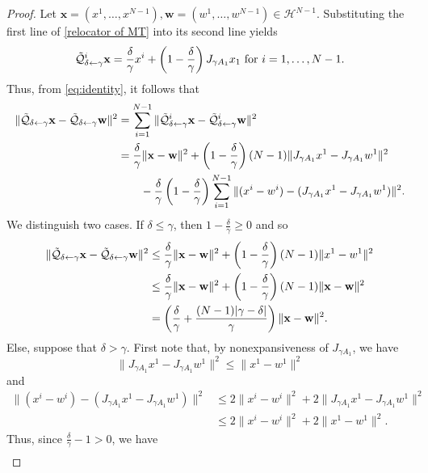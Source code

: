 \documentclass[a4paper,12pt]{article}
\begin{document}
\begin{proof}
    Let $\mathbf{x}=(x^1,\dots,x^{N-1}), \mathbf{w}=(w^1,\dots,w^{N-1}) \in \mathcal{H}^{N-1}$. Substituting the first line of \eqref{relocator of MT} into its second line yields 
\begin{equation*}\mathcal{\Tilde{Q}}^i_{\delta\leftarrow\gamma} \mathbf{x}=\frac{\delta}{\gamma}x^i+ \left( 1 - \frac{\delta}{\gamma} \right) J_{\gamma A_1}x_1 \text{~for~}i=1,\dots,N-1.
\end{equation*}
Thus, from \eqref{eq:identity}, it follows that
\begin{align*}    \|\mathcal{\Tilde{Q}}_{\delta\gets\gamma}\mathbf{x}-\mathcal{\Tilde{Q}}_{\delta\gets\gamma}\mathbf{w}\|^2
    &= \sum_{i=1}^{N-1} \|\mathcal{\Tilde{Q}}_{\delta\gets\gamma}^i\mathbf{x}-\mathcal{\Tilde{Q}}_{\delta\gets\gamma}^i\mathbf{w}\|^2 \\ & =
    \frac{\delta}{\gamma}\|\mathbf{x}-\mathbf{w}\|^2+\left( 1 - \frac{\delta}{\gamma} \right)(N-1)\|J_{\gamma A_1}x^1-J_{\gamma A_1}w^1\|^2 \\
    &\qquad - \frac{\delta}{\gamma}\left( 1 - \frac{\delta}{\gamma} \right)\sum_{i=1}^{N-1}\|(x^i-w^i)-(J_{\gamma A_1}x^1-J_{\gamma A_1}w^1)\|^2.
\end{align*} 
We distinguish two cases. If $\delta\leq\gamma$, then $1-\frac{\delta}{\gamma}\geq 0$ and so
\begin{align*}
    \|\mathcal{\Tilde{Q}}_{\delta\gets\gamma}\mathbf{x}-\mathcal{\Tilde{Q}}_{\delta\gets\gamma}\mathbf{w}\|^2
    &\leq \frac{\delta}{\gamma}\|\mathbf{x}-\mathbf{w}\|^2+\left( 1 - \frac{\delta}{\gamma} \right)(N-1)\|x^1-w^1\|^2\\
    &\leq \frac{\delta}{\gamma}\|\mathbf{x}-\mathbf{w}\|^2+\left( 1 - \frac{\delta}{\gamma} \right)(N-1)\|\mathbf{x}-\mathbf{w}\|^2\\
    &= \left(\frac{\delta}{\gamma}+\frac{(N-1)|\gamma-\delta|}{\gamma} \right)\|\mathbf{x}-\mathbf{w}\|^2.
\end{align*}
Else, suppose that $\delta>\gamma$. First note that, by nonexpansiveness of $J_{\gamma A_1}$, we have
$$ \|J_{\gamma A_1}x^1-J_{\gamma A_1}w^1\|^2 \leq \|x^1-w^1\|^2$$
and
\begin{align*}
    \|(x^i-w^i)-(J_{\gamma A_1}x^1-J_{\gamma A_1}w^1)\|^2
    & \leq 2\|x^i-w^i \| ^2 + 2\|J_{\gamma A_1}x^1-J_{\gamma A_1}w^1\|^2 \\
    &\leq 2\|x^i-w^i\|^2 + 2\|x^1-w^1\|^2.
\end{align*}
Thus, since $\frac{\delta}{\gamma}-1>0$, we have
\begin{align*}

\end{align*}
\end{proof}
\end{document}
